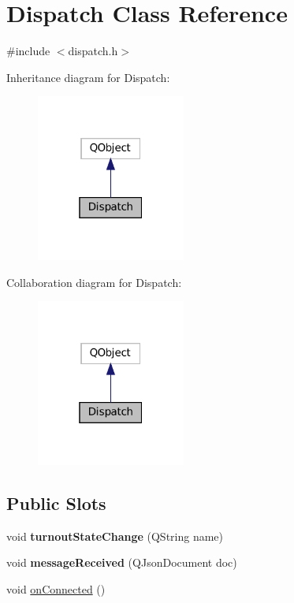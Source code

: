 \hypertarget{classDispatch}{}\section{Dispatch Class Reference}
\label{classDispatch}


{\ttfamily \#include $<$dispatch.\+h$>$}



Inheritance diagram for Dispatch\+:
\nopagebreak
\begin{figure}[H]
\begin{center}
\leavevmode
\includegraphics[width=139pt]{classDispatch__inherit__graph}
\end{center}
\end{figure}


Collaboration diagram for Dispatch\+:
\nopagebreak
\begin{figure}[H]
\begin{center}
\leavevmode
\includegraphics[width=139pt]{classDispatch__coll__graph}
\end{center}
\end{figure}
\subsection*{Public Slots}
\begin{DoxyCompactItemize}
\item 
\mbox{\label{classDispatch_a1614e71f00049c8aa97656da43b9a760}} 
void {\bfseries turnout\+State\+Change} (Q\+String name)
\item 
\mbox{\label{classDispatch_a1c92dd3797f9abd81064b81fa303f8bc}} 
void {\bfseries message\+Received} (Q\+Json\+Document doc)
\item 
void \hyperlink{classDispatch_a9778159aee91f361533c1121b49b507b}{on\+Connected} ()
\end{DoxyCompactItemize}
